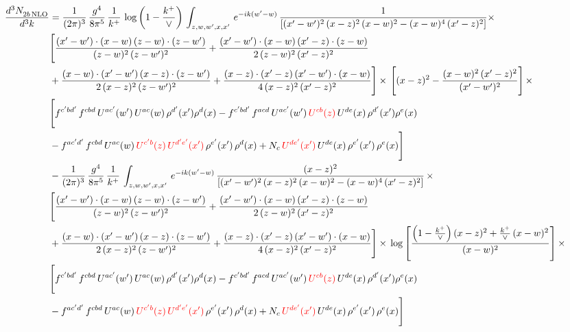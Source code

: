 \documentclass[9pt]{article}
\numberwithin{equation}{section}
\begin{document}
\begin{align}
    \frac{d^{3}N_{2b\,\rm NLO}^{\rm}}{d^{3}k}  & =  \frac{1}{(2\pi)^{3}}\, \frac{g^{4}}{8\pi^{5}}\,\frac{1}{k^{+}}\,\log{\left(1-\frac{k^{+}}{\vee}\right)}\,\int_{z,w,w^{\prime},x,x'}\, e^{-ik(w^{\prime}-w)}\, \frac{1}{\left[(x'-w')^{2}\,(x-z)^{2}\,(x-w)^{2} - (x-w)^{4}\, (x'-z)^{2}\right]} \times\notag \\ & \Bigg[\frac{(x'-w')\cdot (x-w)\, (z-w)\cdot (z-w')}{(z-w)^{2}\, (z-w')^{2}}+\frac{(x'-w')\cdot (x-w)\, (x'-z)\cdot (z-w)}{2\, (z-w)^{2}\, (x'-z)^{2}}\notag \\ & +\frac{(x-w)\cdot (x'-w')\, (x-z)\cdot (z-w')}{2\, (x-z)^{2}\, (z-w')^{2}}+\frac{(x-z)\cdot (x'-z)\, (x'-w')\cdot (x-w)}{4\, (x-z)^{2}\, (x'-z)^{2}}\Bigg] \times\,\Bigg[(x-z)^{2} - \frac{(x-w)^{2}\, (x'-z)^{2}}{(x'-w')^{2}}\Bigg]\,\times \notag \\ & \Bigg[f^{c'bd'}\,f^{cbd}\, U^{ac'}(w')\,U^{ac}(w)\,\rho^{d'}(x')\rho^{d}(x)- f^{c'bd'}\,f^{acd}\,U^{ac'}(w')\,{\color{red}U^{cb}(z)}\,U^{de}(x)\,\rho^{d'}(x')\rho^{e}(x) \notag \\ & -f^{ac'd'}\,f^{cbd}\,U^{ac}(w)\,{\color{red}U^{c'b}(z)\,U^{d'e'}(x')}\,\rho^{e'}(x')\,\rho^{d}(x) +N_{c}\,{\color{red}U^{de'}(x')}\,U^{de}(x)\,\rho^{e'}(x')\,\rho^{e}(x)\Bigg] \notag \\
&  - \frac{1}{(2\pi)^{3}}\, \frac{g^{4}}{8\pi^{5}}\,\frac{1}{k^{+}}\,\int_{z,w,w^{\prime},x,x'}\, e^{-ik(w^{\prime}-w)}\, \frac{(x-z)^{2}}{\left[(x'-w')^{2}\,(x-z)^{2}\,(x-w)^{2} - (x-w)^{4}\, (x'-z)^{2}\right]}\,  \times\notag \\ & \Bigg[\frac{(x'-w')\cdot (x-w)\, (z-w)\cdot (z-w')}{(z-w)^{2}\, (z-w')^{2}}+\frac{(x'-w')\cdot (x-w)\, (x'-z)\cdot (z-w)}{2\, (z-w)^{2}\, (x'-z)^{2}}\notag \\ & +\frac{(x-w)\cdot (x'-w')\, (x-z)\cdot (z-w')}{2\, (x-z)^{2}\, (z-w')^{2}}+\frac{(x-z)\cdot (x'-z)\, (x'-w')\cdot (x-w)}{4\, (x-z)^{2}\, (x'-z)^{2}}\Bigg] \times\,\log{\left[\frac{\left(1-\frac{k^{+}}{\vee}\right)(x-z)^{2}+\frac{k^{+}}{\vee}\,(x-w)^{2}}{(x-w)^{2}}\right]}\,\times \notag \\ & \Bigg[f^{c'bd'}\,f^{cbd}\, U^{ac'}(w')\,U^{ac}(w)\,\rho^{d'}(x')\rho^{d}(x)- f^{c'bd'}\,f^{acd}\,U^{ac'}(w')\,{\color{red}U^{cb}(z)}\,U^{de}(x)\,\rho^{d'}(x')\rho^{e}(x) \notag \\ & -f^{ac'd'}\,f^{cbd}\,U^{ac}(w)\,{\color{red}U^{c'b}(z)\,U^{d'e'}(x')}\,\rho^{e'}(x')\,\rho^{d}(x) +N_{c}\,{\color{red}U^{de'}(x')}\,U^{de}(x)\,\rho^{e'}(x')\,\rho^{e}(x)\Bigg] \notag \\

\end{align}
\end{document}
